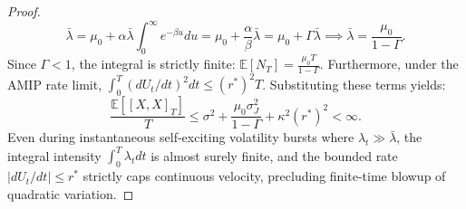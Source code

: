 \documentclass[11pt,a4paper]{article}
\theoremstyle{definition}\newtheorem{definition}[theorem]{Definition}
\theoremstyle{remark}\newtheorem{remark}[theorem]{Remark}
\begin{document}
\begin{proof}
\begin{equation}
\bar{\lambda} = \mu_0 + \alpha \bar{\lambda} \int_0^\infty e^{-\beta u} du = \mu_0 + \frac{\alpha}{\beta} \bar{\lambda} = \mu_0 + \Gamma \bar{\lambda} \implies \bar{\lambda} = \frac{\mu_0}{1 - \Gamma}.
\end{equation}
Since $\Gamma < 1$, the integral is strictly finite: $\mathbb{E}[N_T] = \frac{\mu_0 T}{1 - \Gamma}$.
Furthermore, under the AMIP rate limit, $\int_0^T (dU_t/dt)^2 dt \le (r^*)^2 T$.
Substituting these terms yields:
\begin{equation}
\frac{\mathbb{E}[[X, X]_T]}{T} \le \sigma^2 + \frac{\mu_0 \sigma_J^2}{1 - \Gamma} + \kappa^2 (r^*)^2 < \infty.
\end{equation}
Even during instantaneous self-exciting volatility bursts where $\lambda_t \gg \bar{\lambda}$, the integral intensity $\int_0^T \lambda_t dt$ is almost surely finite, and the bounded rate $|dU_t/dt| \le r^*$ strictly caps continuous velocity, precluding finite-time blowup of quadratic variation.
\end{proof}
\end{document}
